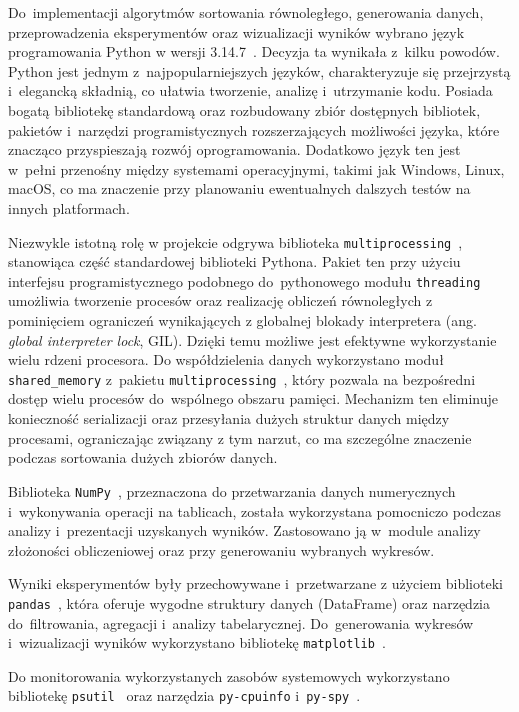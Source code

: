 Do~implementacji algorytmów sortowania równoległego, generowania danych, przeprowadzenia eksperymentów oraz wizualizacji wyników wybrano 
język programowania Python w wersji 3.14.7~\cite{bib:Python}. Decyzja ta wynikała z~kilku powodów. Python jest jednym z~najpopularniejszych 
języków, charakteryzuje się przejrzystą i~elegancką składnią, co ułatwia tworzenie, analizę i~utrzymanie kodu. 
Posiada bogatą bibliotekę standardową oraz rozbudowany zbiór dostępnych bibliotek, pakietów i~narzędzi programistycznych rozszerzających 
możliwości języka, które znacząco przyspieszają rozwój oprogramowania. Dodatkowo język ten jest w~pełni przenośny między systemami 
operacyjnymi, takimi jak Windows, Linux, macOS, co ma znaczenie przy planowaniu ewentualnych dalszych testów na innych platformach.

Niezwykle istotną rolę w projekcie odgrywa biblioteka \texttt{multiprocessing}~\cite{bib:Multiprocessing}, stanowiąca część standardowej 
biblioteki Pythona. Pakiet ten przy użyciu interfejsu programistycznego podobnego do~pythonowego modułu \texttt{threading} umożliwia 
tworzenie procesów oraz realizację obliczeń równoległych z pominięciem ograniczeń wynikających z globalnej blokady interpretera 
(ang. \textit{global interpreter lock}, GIL). Dzięki temu możliwe jest efektywne wykorzystanie wielu rdzeni procesora. 
Do współdzielenia danych wykorzystano moduł \texttt{shared\_memory} z~pakietu \texttt{multiprocessing}~\cite{bib:SharedMemory}, 
który pozwala na bezpośredni dostęp wielu procesów do~wspólnego obszaru pamięci. 
Mechanizm ten eliminuje konieczność serializacji oraz przesyłania dużych struktur danych między procesami, 
ograniczając związany z tym narzut, co ma szczególne znaczenie podczas sortowania dużych zbiorów danych.

Biblioteka \texttt{NumPy}~\cite{bib:NumPy}, przeznaczona do przetwarzania danych numerycznych i~wykonywania operacji na tablicach, 
została wykorzystana pomocniczo podczas analizy i~prezentacji uzyskanych wyników. 
Zastosowano ją w~module analizy złożoności obliczeniowej oraz przy generowaniu wybranych wykresów.

Wyniki eksperymentów były przechowywane i~przetwarzane z użyciem biblioteki \texttt{pandas}~\cite{bib:Pandas}, która oferuje wygodne 
struktury danych (DataFrame) oraz narzędzia do~filtrowania, agregacji i~analizy tabelarycznej. Do~generowania wykresów i~wizualizacji 
wyników wykorzystano bibliotekę \texttt{matplotlib}~\cite{bib:Matplotlib}.

Do monitorowania wykorzystanych zasobów systemowych wykorzystano bibliotekę \texttt{psutil}~\cite{bib:Psutil} oraz 
narzędzia \texttt{py-cpuinfo} i~\texttt{py-spy}~\cite{bib:PySpy}. 

